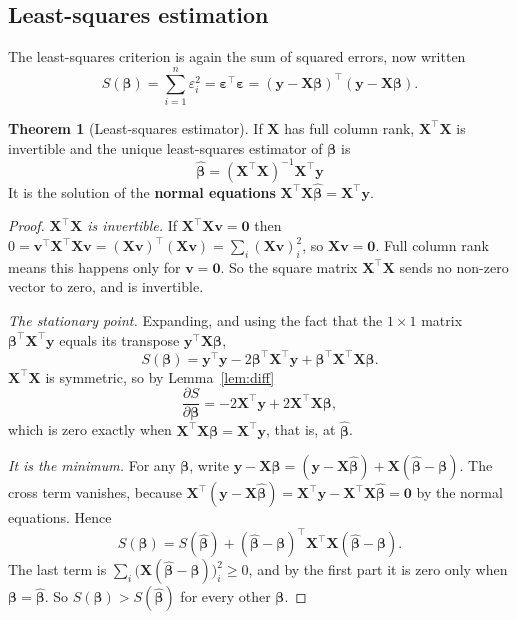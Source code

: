 \documentclass[11pt,a4paper]{article}
\numberwithin{equation}{section}
\theoremstyle{definition}
\newtheorem{thm}{Theorem}[subsection]
\begin{document}
\subsection{Least-squares estimation}
The least-squares criterion is again the sum of squared errors, now written
\[
S(\boldsymbol\beta) = \sum_{i=1}^n \varepsilon_i^2 = \boldsymbol\varepsilon^\top \boldsymbol\varepsilon
= (\mathbf{y} - \mathbf{X}\boldsymbol\beta)^\top (\mathbf{y} - \mathbf{X}\boldsymbol\beta) .
\]

\begin{thm}[Least-squares estimator]\label{thm:ls-matrix}
If $\mathbf{X}$ has full column rank, $\mathbf{X}^\top \mathbf{X}$ is invertible and the
unique least-squares estimator of $\boldsymbol\beta$ is
\[
\boxed{\;\hat{\boldsymbol\beta} = (\mathbf{X}^\top \mathbf{X})^{-1} \mathbf{X}^\top \mathbf{y}\;}
\]
It is the solution of the \textbf{normal equations}
$\mathbf{X}^\top \mathbf{X} \hat{\boldsymbol\beta} = \mathbf{X}^\top \mathbf{y}$.
\end{thm}

\begin{proof}
\emph{$\mathbf{X}^\top\mathbf{X}$ is invertible.} If $\mathbf{X}^\top\mathbf{X}\mathbf{v} = \mathbf{0}$
then $0 = \mathbf{v}^\top \mathbf{X}^\top \mathbf{X} \mathbf{v} = (\mathbf{Xv})^\top (\mathbf{Xv}) = \sum_i (\mathbf{Xv})_i^2$,
so $\mathbf{Xv} = \mathbf{0}$. Full column rank means this happens only for
$\mathbf{v} = \mathbf{0}$. So the square matrix $\mathbf{X}^\top\mathbf{X}$ sends no
non-zero vector to zero, and is invertible.

\emph{The stationary point.} Expanding, and using the fact that the $1\times1$ matrix
$\boldsymbol\beta^\top \mathbf{X}^\top \mathbf{y}$ equals its transpose $\mathbf{y}^\top \mathbf{X}\boldsymbol\beta$,
\[
S(\boldsymbol\beta) = \mathbf{y}^\top\mathbf{y} - 2\boldsymbol\beta^\top \mathbf{X}^\top \mathbf{y}
  + \boldsymbol\beta^\top \mathbf{X}^\top \mathbf{X} \boldsymbol\beta .
\]
$\mathbf{X}^\top\mathbf{X}$ is symmetric, so by Lemma~\ref{lem:diff}
\[
\frac{\partial S}{\partial \boldsymbol\beta} = -2\mathbf{X}^\top\mathbf{y} + 2\mathbf{X}^\top\mathbf{X}\boldsymbol\beta ,
\]
which is zero exactly when $\mathbf{X}^\top\mathbf{X}\boldsymbol\beta = \mathbf{X}^\top\mathbf{y}$,
that is, at $\hat{\boldsymbol\beta}$.

\emph{It is the minimum.} For any $\boldsymbol\beta$, write
$\mathbf{y} - \mathbf{X}\boldsymbol\beta = (\mathbf{y} - \mathbf{X}\hat{\boldsymbol\beta}) + \mathbf{X}(\hat{\boldsymbol\beta} - \boldsymbol\beta)$.
The cross term vanishes, because
$\mathbf{X}^\top(\mathbf{y} - \mathbf{X}\hat{\boldsymbol\beta}) = \mathbf{X}^\top\mathbf{y} - \mathbf{X}^\top\mathbf{X}\hat{\boldsymbol\beta} = \mathbf{0}$
by the normal equations. Hence
\[
S(\boldsymbol\beta) = S(\hat{\boldsymbol\beta})
  + (\hat{\boldsymbol\beta} - \boldsymbol\beta)^\top \mathbf{X}^\top \mathbf{X} (\hat{\boldsymbol\beta} - \boldsymbol\beta) .
\]
The last term is $\sum_i \bigl(\mathbf{X}(\hat{\boldsymbol\beta} - \boldsymbol\beta)\bigr)_i^2 \ge 0$,
and by the first part it is zero only when $\boldsymbol\beta = \hat{\boldsymbol\beta}$.
So $S(\boldsymbol\beta) > S(\hat{\boldsymbol\beta})$ for every other $\boldsymbol\beta$.
\end{proof}
\end{document}
